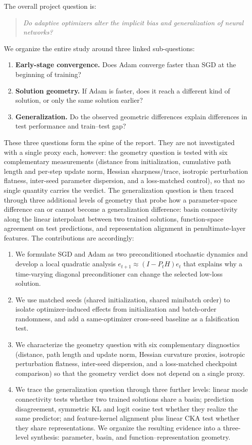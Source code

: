 \documentclass[11pt]{article}
\begin{document}
The overall project question is: \begin{quote} \emph{Do adaptive optimizers alter the implicit bias and generalization of neural networks?} \end{quote} We organize the entire study around three linked sub-questions: \begin{enumerate} \item \textbf{Early-stage convergence.} Does Adam converge faster than SGD at the beginning of training? \item \textbf{Solution geometry.} If Adam is faster, does it reach a different kind of solution, or only the same solution earlier? \item \textbf{Generalization.} Do the observed geometric differences explain differences in test performance and train--test gap? \end{enumerate} These three questions form the spine of the report. They are not investigated with a single proxy each, however: the geometry question is tested with six complementary measurements (distance from initialization, cumulative path length and per-step update norm, Hessian sharpness/trace, isotropic perturbation flatness, inter-seed parameter dispersion, and a loss-matched control), so that no single quantity carries the verdict. The generalization question is then traced through three additional levels of geometry that probe how a parameter-space difference can or cannot become a generalization difference: basin connectivity along the linear interpolant between two trained solutions, function-space agreement on test predictions, and representation alignment in penultimate-layer features. The contributions are accordingly: \begin{enumerate} \item We formulate SGD and Adam as two preconditioned stochastic dynamics and develop a local quadratic analysis $e_{t+1}\approx (I-P_tH)e_t$ that explains why a time-varying diagonal preconditioner can change the selected low-loss solution. \item We use matched seeds (shared initialization, shared minibatch order) to isolate optimizer-induced effects from initialization and batch-order randomness, and add a same-optimizer cross-seed baseline as a falsification test. \item We characterize the geometry question with six complementary diagnostics (distance, path length and update norm, Hessian curvature proxies, isotropic perturbation flatness, inter-seed dispersion, and a loss-matched checkpoint comparison) so that the geometry verdict does not depend on a single proxy. \item We trace the generalization question through three further levels: linear mode connectivity tests whether two trained solutions share a basin; prediction disagreement, symmetric KL and logit cosine test whether they realize the same predictor; and feature-kernel alignment plus linear CKA test whether they share representations. We organize the resulting evidence into a three-level synthesis: parameter, basin, and function--representation geometry. \end{enumerate}
\end{document}
